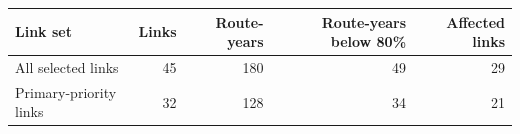 \begin{tabular}{lrrrr}
\toprule
Link set & Links & Route-years & Route-years below 80\% & Affected links\\
\midrule
All selected links & 45 & 180 & 49 & 29\\
Primary-priority links & 32 & 128 & 34 & 21\\
\bottomrule
\end{tabular}
\\[0.5em]
\noindent{}
